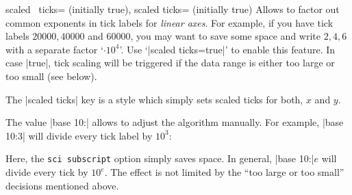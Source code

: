 \label{sec:scaled:ticks}%
\begin{pgfplotsxykeylist}{
	scaled \x\ ticks= (initially true),
	scaled ticks= (initially true)}
Allows to factor out common exponents in tick labels for \emph{linear axes}. For example, if you have tick labels $20000,40000$ and $60000$, you may want to save some space and write $2,4,6$ with a separate factor `$\cdot 10^4$'. Use `|scaled ticks=true|' to enable this feature. In case |true|, tick scaling will be triggered if the data range is either too large or too small (see below).
\begin{codeexample}[]
%
\end{codeexample}

\begin{codeexample}[]
\end{codeexample}

	The |scaled ticks| key is a style which simply sets scaled ticks for both, $x$ and $y$.

	The value |base 10:| allows to adjust the algorithm manually. For example, |base 10:3| will divide every tick label by $10^3$:
\begin{codeexample}[]
\end{codeexample}
\noindent Here, the \texttt{sci subscript} option simply saves space.
In general, |base 10:|$e$ will divide every tick by $10^e$. The effect
is not limited by the ``too large or too small'' decisions mentioned
above.


\end{pgfplotsxykeylist}
